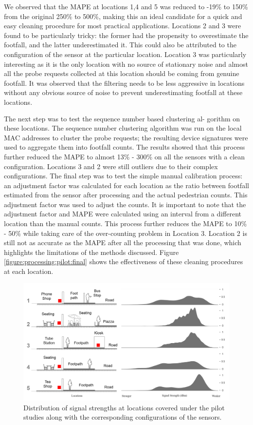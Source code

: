 We observed that the MAPE at locations 1,4 and 5 was reduced to -19\% to 150\% from the original 250\% to 500\%, making this an ideal candidate for a quick and easy cleaning procedure for most practical applications.
Locations 2 and 3 were found to be particularly tricky: the former had the propensity to overestimate the footfall, and the latter underestimated it.
This could also be attributed to the configuration of the sensor at the particular location.
Location 3 was particularly interesting as it is the only location with no source of stationary noise and almost all the probe requests collected at this location should be coming from genuine footfall.
It was observed that the filtering needs to be less aggressive in locations without any obvious source of noise to prevent underestimating footfall at these locations.

The next step was to test the sequence number based clustering al- gorithm on these locations.
The sequence number clustering algorithm was run on the local MAC addresses to cluster the probe requests; the resulting device signatures were used to aggregate them into footfall counts.
The results showed that this process further reduced the MAPE to almost 13\% - 300\% on all the sensors with a clean configuration.
Locations 3 and 2 were still outliers due to their complex configurations.
The final step was to test the simple manual calibration process: an adjustment factor was calculated for each location as the ratio between footfall estimated from the sensor after processing and the actual pedestrian counts.
This adjustment factor was used to adjust the counts.
It is important to note that the adjustment factor and MAPE were calculated using an interval from a different location than the manual counts.
This process further reduces the MAPE to 10\% - 50\% while taking care of the over-counting problem in Location 3.
Location 2 is still not as accurate as the MAPE after all the processing that was done, which highlights the limitations of the methods discussed.
Figure \ref{figure:processing:pilot:final} shows the effectiveness of these cleaning procedures at each location.

\begin{figure}
  \includegraphics{images/processing-pilot-signal.png}
  \caption{Distribution of signal strengths at locations covered under the pilot studies along with the corresponding configurations of the sensors.}
  \label{figure:processing:pilot:signal}
\end{figure}


